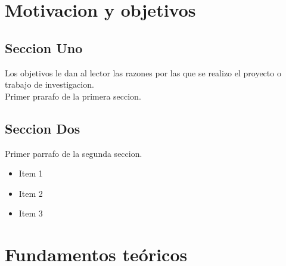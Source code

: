 \documentclass[spanish,a4paper,11pt,twoside]{report}
\begin{document}
\newpage{\pagestyle{empty}\cleardoublepage} %
\listoftables











\newpage{\pagestyle{empty}\cleardoublepage}

\setlength{\parindent}{5mm}

\chapter{Motivacion y objetivos}
\label{chapter:obj}


\section{Seccion Uno}
\label{1:sec:1}

Los objetivos le dan al lector las razones por las que se realizo el
proyecto o trabajo de investigacion.\\
  Primer prarafo de la primera seccion.


\section{Seccion Dos}
\label{1:sec:2}
  Primer parrafo de la segunda seccion.

\begin{itemize}
  \item Item 1
  \item Item 2
  \item Item 3
\end{itemize}

\chapter{Fundamentos teóricos}
\label{chapter:teo}
\end{document}
